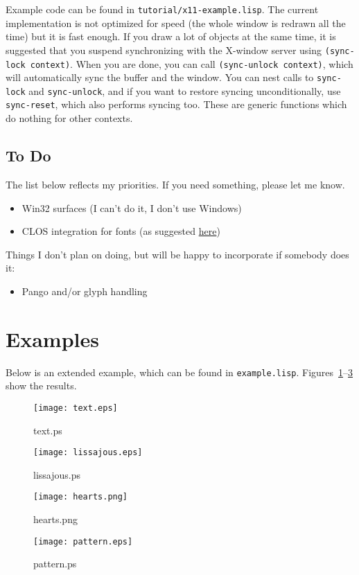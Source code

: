 \documentclass[12pt,letterpaper,dvipdfm]{article}
\begin{document}
Example code can be found in \verb!tutorial/x11-example.lisp!.  The
current implementation is not optimized for speed (the whole window is
redrawn all the time) but it is fast enough.  If you draw a lot of
objects at the same time, it is suggested that you suspend
synchronizing with the X-window server using
 \lstinline!(sync-lock context)!.
  When you are done, you can call \lstinline!(sync-unlock context)!, which will automatically sync the buffer and the window.
You can nest calls to \lstinline!sync-lock!  and
\lstinline!sync-unlock!, and if you want to restore syncing
unconditionally, use \lstinline!sync-reset!, which also performs
syncing too.  These are generic functions which do nothing for other
contexts.



\subsection{To Do}
\label{sec:todo}

The list below reflects my priorities.  If you need something, please
let me know.
\begin{itemize}
\item Win32 surfaces (I can't do it, I don't use Windows)
\item CLOS integration for fonts (as suggested
  \href{http://www.cairographics.org/manual/bindings-fonts.html}{here})
\end{itemize}

Things I don't plan on doing, but will be happy to incorporate if
somebody does it:
\begin{itemize}
\item Pango and/or glyph handling
\end{itemize}


\section{Examples}
\label{sec:examples}

Below is an extended example, which can be found in
\texttt{example.lisp}.  Figures~\ref{fig:text}--\ref{fig:hearts} show
the results.



\begin{figure}[htbp]
  \centering
  \texttt{[image: text.eps]}
  \caption{text.ps}
  \label{fig:text}
\end{figure}

\begin{figure}[htbp]
  \centering
  \texttt{[image: lissajous.eps]}
  \caption{lissajous.ps}
  \label{fig:lissajous}
\end{figure}

\begin{figure}[htbp]
  \centering
  \texttt{[image: hearts.png]}
  \caption{hearts.png}
  \label{fig:hearts}
\end{figure}

\begin{figure}[htbp]
  \centering
  \texttt{[image: pattern.eps]}
  \caption{pattern.ps}
  \label{fig:pattern}
\end{figure}
\end{document}
